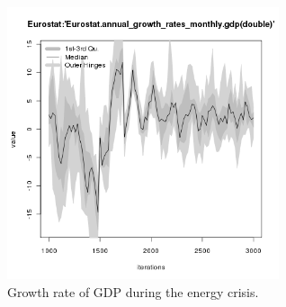 \begin{figure}[ht!]
\centering\leavevmode
\begin{minipage}{17cm}
\centering\leavevmode
\includegraphics[width=8cm]{./energy_shock/png/duration_240/intensity_0.05/frequency_20/Eurostat-annual_growth_rates_monthly_gdp.png}
\end{minipage}
\caption{Growth rate of GDP during the energy crisis.}
\label{Figure: energy shock 4 growth}
\end{figure}

